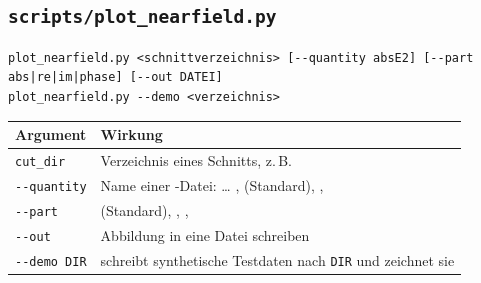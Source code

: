 \subsection*{\texttt{scripts/plot\_nearfield.py}}
\begin{lstlisting}[style=shell]
plot_nearfield.py <schnittverzeichnis> [--quantity absE2] [--part abs|re|im|phase] [--out DATEI]
plot_nearfield.py --demo <verzeichnis>
\end{lstlisting}
\begin{center}
\small
\begin{tabularx}{\linewidth}{lY}
\toprule
Argument & Wirkung \\
\midrule
\texttt{cut\_dir} & Verzeichnis eines Schnitts, z.\,B.\  \\
\texttt{-{}-quantity} & Name einer -Datei:  \ldots{} ,  (Standard), ,
 \\
\texttt{-{}-part} &  (Standard), , ,  \\
\texttt{-{}-out} & Abbildung in eine Datei schreiben \\
\texttt{-{}-demo DIR} & schreibt synthetische Testdaten nach \texttt{DIR} und zeichnet sie \\
\bottomrule
\end{tabularx}
\end{center}

